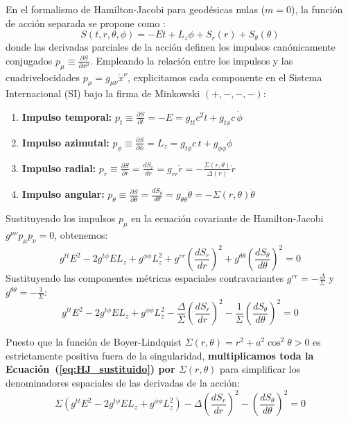 En el formalismo de Hamilton-Jacobi para geodésicas nulas ($m=0$), la función de acción separada se propone como \citep{pdfcoffee.com_chandrasekhar, 1403.5234v2}:
\begin{equation}
    S(t,r,\theta,\phi) = -E t + L_z \phi + S_r(r) + S_\theta(\theta)
    \label{eq:ansatz_S_oficial}
\end{equation}
donde las derivadas parciales de la acción definen los impulsos canónicamente conjugados $p_\mu \equiv \frac{\partial S}{\partial x^\mu}$. Empleando la relación entre los impulsos y las cuadrivelocidades $p_\mu = g_{\mu\nu} \dot{x}^\nu$, explicitamos cada componente en el Sistema Internacional (SI) bajo la firma de Minkowski $(+,-,-,-)$:
\begin{enumerate}
    \item \textbf{Impulso temporal:} $p_t \equiv \frac{\partial S}{\partial t} = -E = g_{tt} c^2 \dot{t} + g_{t\phi} c \, \dot{\phi}$
    \item \textbf{Impulso azimutal:} $p_\phi \equiv \frac{\partial S}{\partial \phi} = L_z = g_{t\phi} c \, \dot{t} + g_{\phi\phi} \dot{\phi}$
    \item \textbf{Impulso radial:} $p_r \equiv \frac{\partial S}{\partial r} = \frac{dS_r}{dr} = g_{rr} \dot{r} = -\frac{\Sigma(r,\theta)}{\Delta(r)} \dot{r}$
    \item \textbf{Impulso angular:} $p_\theta \equiv \frac{\partial S}{\partial \theta} = \frac{dS_\theta}{d\theta} = g_{\theta\theta} \dot{\theta} = -\Sigma(r,\theta) \dot{\theta}$
\end{enumerate}

Sustituyendo los impulsos $p_\mu$ en la ecuación covariante de Hamilton-Jacobi $g^{\mu\nu} p_\mu p_\nu = 0$, obtenemos:
\begin{equation}
    g^{tt} E^2 - 2g^{t\phi} E L_z + g^{\phi\phi} L_z^2 + g^{rr} \left(\frac{dS_r}{dr}\right)^2 + g^{\theta\theta} \left(\frac{dS_\theta}{d\theta}\right)^2 = 0
    \label{eq:HJ_impulsos}
\end{equation}
Sustituyendo las componentes métricas espaciales contravariantes $g^{rr} = -\frac{\Delta}{\Sigma}$ y $g^{\theta\theta} = -\frac{1}{\Sigma}$:
\begin{equation}
    g^{tt} E^2 - 2g^{t\phi} E L_z + g^{\phi\phi} L_z^2 - \frac{\Delta}{\Sigma} \left(\frac{dS_r}{dr}\right)^2 - \frac{1}{\Sigma} \left(\frac{dS_\theta}{d\theta}\right)^2 = 0
    \label{eq:HJ_sustituido}
\end{equation}

Puesto que la función de Boyer-Lindquist $\Sigma(r,\theta) = r^2 + a^2 \cos^2\theta > 0$ es estrictamente positiva fuera de la singularidad, \textbf{multiplicamos toda la Ecuación~(\ref{eq:HJ_sustituido}) por $\Sigma(r,\theta)$} para simplificar los denominadores espaciales de las derivadas de la acción:
\begin{equation}
    \Sigma \left( g^{tt} E^2 - 2g^{t\phi} E L_z + g^{\phi\phi} L_z^2 \right) - \Delta \left(\frac{dS_r}{dr}\right)^2 - \left(\frac{dS_\theta}{d\theta}\right)^2 = 0
    \label{eq:HJ_multiplicado_sigma}
\end{equation}

